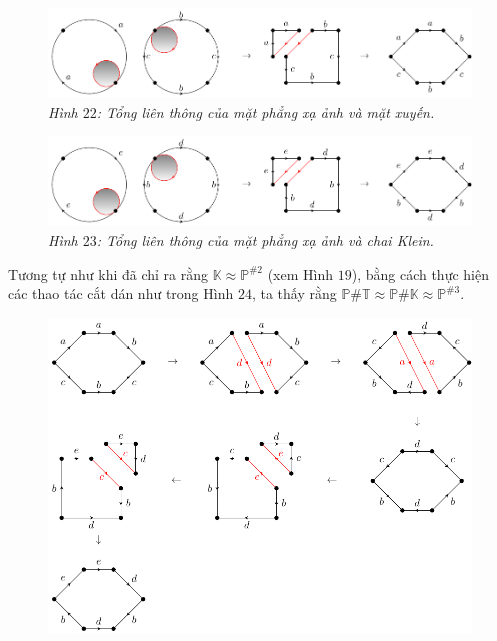 \begin{multicols}{2}
\begin{figure}[H]
		\includegraphics[width=1\linewidth]{H22.pdf}
		\caption{\small\textit{\color{duongvaotoanhoc}Hình $22$: Tổng liên thông của mặt phẳng xạ ảnh và mặt xuyến.}}
		\vspace*{-10pt}
	\end{figure}
	\begin{figure}[H]
		\vspace*{-5pt}
		\centering\captionsetup{labelformat=empty, justification=centering}
		\includegraphics[width=1\linewidth]{H23.pdf}
		\caption{\small\textit{\color{duongvaotoanhoc}Hình $23$: Tổng liên thông của mặt phẳng xạ ảnh và chai Klein.}}
		\vspace*{-10pt}
	\end{figure}
	Tương tự như khi đã chỉ ra rằng $\mathbb{K} \approx \mathbb{P}^{\# 2}$ (xem Hình $19$), bằng cách thực hiện các thao tác cắt dán như trong Hình $24$, ta thấy rằng $\mathbb{P} \# \mathbb{T} \approx \mathbb{P} \# \mathbb{K} \approx \mathbb{P}^{\# 3}$.
	\begin{figure}[H]
		\vspace*{-5pt}
		\centering\captionsetup{labelformat=empty, justification=centering}
		\includegraphics[width=1\linewidth]{H24.pdf}

\end{figure}
\end{multicols}
